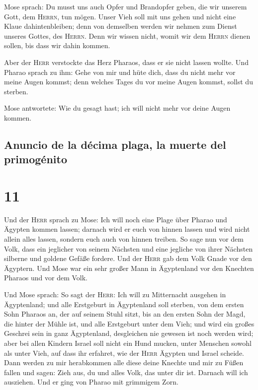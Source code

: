  Mose sprach: Du musst uns auch Opfer und Brandopfer
geben, die wir unserem Gott, dem \textsc{Herrn}, tun mögen.
 Unser Vieh soll mit uns gehen und nicht eine Klaue
dahintenbleiben; denn von demselben werden wir nehmen zum Dienst unseres
Gottes, des \textsc{Herrn}. Denn wir wissen nicht, womit wir dem
\textsc{Herrn} dienen sollen, bis dass wir dahin kommen.

 Aber der \textsc{Herr} verstockte das Herz Pharaos, dass
er sie nicht lassen wollte.  Und Pharao sprach zu ihm:
Gehe von mir und hüte dich, dass du nicht mehr vor meine Augen kommst;
denn welches Tages du vor meine Augen kommst, sollst du sterben.

 Mose antwortete: Wie du gesagt hast; ich will nicht mehr
vor deine Augen kommen.

\hypertarget{anuncio-de-la-duxe9cima-plaga-la-muerte-del-primoguxe9nito}{%
\subsection{Anuncio de la décima plaga, la muerte del
primogénito}\label{anuncio-de-la-duxe9cima-plaga-la-muerte-del-primoguxe9nito}}

\hypertarget{section-10}{%
\section{11}\label{section-10}}

 Und der \textsc{Herr} sprach zu Mose: Ich will noch eine
Plage über Pharao und Ägypten kommen lassen; darnach wird er euch von
hinnen lassen und wird nicht allein alles lassen, sondern euch auch von
hinnen treiben.  So sage nun vor dem Volk, dass ein
jeglicher von seinem Nächsten und eine jegliche von ihrer Nächsten
silberne und goldene Gefäße fordere.  Und der
\textsc{Herr} gab dem Volk Gnade vor den Ägyptern. Und Mose war ein sehr
großer Mann in Ägyptenland vor den Knechten Pharaos und vor dem Volk.

 Und Mose sprach: So sagt der \textsc{Herr}: Ich will zu
Mitternacht ausgehen in Ägyptenland;  und alle Erstgeburt
in Ägyptenland soll sterben, von dem ersten Sohn Pharaos an, der auf
seinem Stuhl sitzt, bis an den ersten Sohn der Magd, die hinter der
Mühle ist, und alle Erstgeburt unter dem Vieh;  und wird
ein großes Geschrei sein in ganz Ägyptenland, desgleichen nie gewesen
ist noch werden wird;  aber bei allen Kindern Israel soll
nicht ein Hund mucken, unter Menschen sowohl als unter Vieh, auf dass
ihr erfahret, wie der \textsc{Herr} Ägypten und Israel scheide.
 Dann werden zu mir herabkommen alle diese deine Knechte
und mir zu Füßen fallen und sagen: Zieh aus, du und alles Volk, das
unter dir ist. Darnach will ich ausziehen. Und er ging von Pharao mit
grimmigem Zorn.

